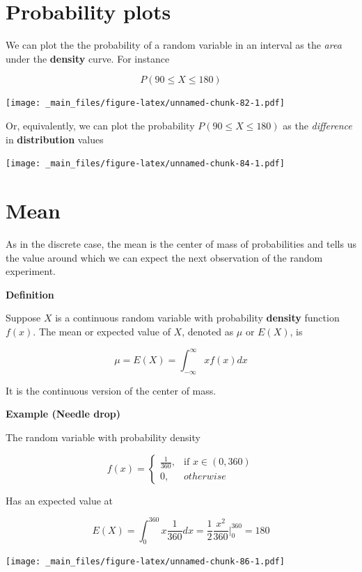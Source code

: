\documentclass[
]{book}
\begin{document}
\newpage

\hypertarget{probability-plots}{%
\section{Probability plots}\label{probability-plots}}

We can plot the the probability of a random variable in an interval as the \emph{area} under the \textbf{density} curve. For instance

\[P(90\leq X \leq 180)\]

\texttt{[image: \_main\_files/figure-latex/unnamed-chunk-82-1.pdf]}

Or, equivalently, we can plot the probability \(P(90 \leq X \leq 180)\) as the \emph{difference} in \textbf{distribution} values

\texttt{[image: \_main\_files/figure-latex/unnamed-chunk-84-1.pdf]}

\hypertarget{mean}{%
\section{Mean}\label{mean}}

As in the discrete case, the mean is the center of mass of probabilities and tells us the value around which we can expect the next observation of the random experiment.

\textbf{Definition}

Suppose \(X\) is a continuous random variable with probability \textbf{density} function \(f(x)\). The mean or expected value of \(X\), denoted as \(\mu\) or \(E(X)\), is

\[\mu=E(X)=\int_{-\infty}^\infty x f(x) dx\]

It is the continuous version of the center of mass.

\textbf{Example (Needle drop)}

The random variable with probability density

\[
    f(x)= 
\begin{cases}
    \frac{1}{360},& \text{if } x\in (0,360)\\
    0,& otherwise 
\end{cases}
\]

Has an expected value at

\[E(X)=\int_{0}^{360} x\frac{1}{360}dx= \frac{1}{2}\frac{x^2}{360} |_0^{360}= 180\]

\texttt{[image: \_main\_files/figure-latex/unnamed-chunk-86-1.pdf]}
\end{document}

